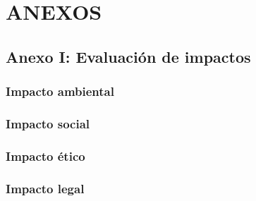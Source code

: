 \documentclass[a4paper, 12pt, spanish, twoside]{article}
\begin{document}
\section*{ANEXOS} \label{sec:anexos} %

\renewcommand{\thesubsection}{\Alph{subsection}} %
\renewcommand{\thetable}{\Alph{subsection}.\arabic{table}}
\renewcommand{\thefigure}{\Alph{subsection}.\arabic{figure}}
\renewcommand{\thecode}{\Alph{subsection}.\arabic{code}}


\subsection{Anexo I: Evaluación de impactos} \label{sec:anexo1}
\subsubsection{Impacto ambiental} \label{sec:anexo1:ambiental}
\subsubsection{Impacto social} \label{sec:anexo1:social}
\subsubsection{Impacto ético} \label{sec:anexo1:etico}
\subsubsection{Impacto legal} \label{sec:anexo1:legal}
\end{document}
